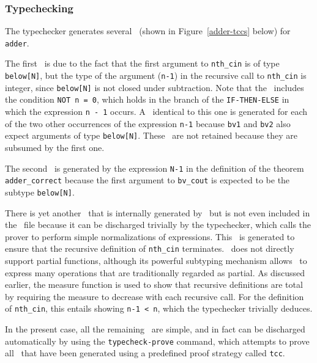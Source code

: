 \subsubsection{Typechecking}

The typechecker generates several \tccs\
(shown in Figure~\ref{adder-tccs} below) for {\tt adder}.


The first \tcc\ is due to the fact that the first argument to {\tt nth\_cin}
is of type {\tt below[N]}, but the type of the argument ({\tt n-1})
in the recursive
call to {\tt nth\_cin} is integer, since {\tt below[N]} is not closed
under subtraction.
Note that the \tcc\ includes the condition {\tt NOT n = 0}, which holds
in the branch of the {\tt IF-THEN-ELSE} in which the expression
{\tt n - 1} occurs.
A \tcc\ identical to this one is generated for each
of the two other occurrences of the expression {\tt n-1} because
{\tt bv1} and {\tt bv2} also expect arguments of type {\tt below[N]}.
These \tccs\ are not retained because they are subsumed by the first one.

The second \tcc\ is generated by the expression {\tt N-1} in the
definition of the theorem {\tt adder\_correct} because the first
argument to {\tt bv\_cout} is expected to be the subtype {\tt below[N]}.

There is yet another \tcc\ that is internally generated
by \pvs\ but is not even included in the \tccs\ file because
it can be discharged trivially by the typechecker, which calls
the prover to perform simple normalizations of expressions.
This \tcc\ is generated to ensure that the recursive definition
of {\tt nth\_cin} terminates.
\pvs\ does not directly support partial
functions, although its powerful subtyping mechanism allows \pvs\ to
express many operations that are traditionally regarded as partial.
As discussed earlier, the
measure function is used to show that recursive definitions are total by
requiring the measure to decrease with each recursive call.
For the definition of {\tt nth\_cin}, this entails showing
{\tt n-1 < n}, which the typechecker trivially deduces.

In the present case, all the remaining \tccs\ are simple, and in fact can be
discharged automatically
by using the {\tt typecheck-prove} command, which attempts
to prove all \tccs\ that have been generated using a predefined
proof strategy called {\tt tcc}.

